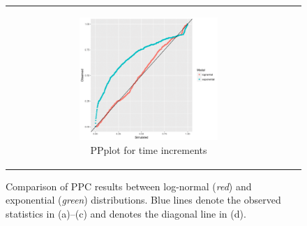\documentclass[ba]{imsart}
\numberwithin{equation}{section}
\theoremstyle{plain}
\begin{document}
\begin{figure}[H]
\begin{tabular}[t]{cc}
\begin{subfigure}[b]{0.495\textwidth}
				\end{subfigure}
				\begin{subfigure}[b]{0.495\textwidth}
					\centering
					\caption{PPplot for time increments}
					\includegraphics[width=0.625\textwidth]{img/timepp_two-1.png}
				\end{subfigure}
			\end{tabular}
			\caption {Comparison of PPC results between log-normal (\textit{red}) and exponential (\textit{green}) distributions. Blue lines denote the observed statistics in (a)--(c) and denotes the diagonal line in (d).}
			\label{figure:PPCtwo}
		\end{figure}
		\newpage
\end{document}
